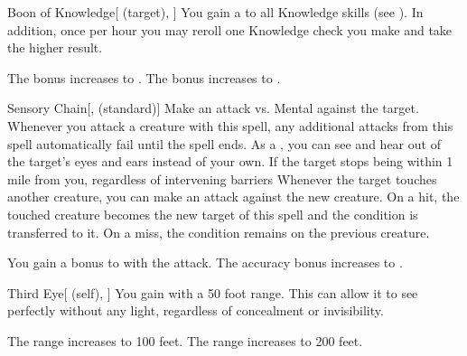 \lowercase{\hypertarget{spell:Boon of Knowledge}{}}\label{spell:Boon of Knowledge}
\begin{attuneability}[Rank 4]{\hypertarget{spell:Boon of Knowledge}{Boon of Knowledge}}[ (target), ]
You gain a   to all Knowledge skills (see ).
In addition, once per hour you may reroll one Knowledge check you make and take the higher result.

\rankline
{} The bonus increases to .
 The bonus increases to .
\end{attuneability}
\vspace{0.25em}



\lowercase{\hypertarget{spell:Sensory Chain}{}}\label{spell:Sensory Chain}
\begin{freeability}[Rank 4]{\hypertarget{spell:Sensory Chain}{Sensory Chain}}[,  (standard)]
Make an attack vs. Mental against the target.
Whenever you attack a creature with this spell, any additional attacks from this spell automatically fail until the spell ends.
\hit As a , you can see and hear out of the target's eyes and ears instead of your own.
If the target stops being within 1 mile from you, regardless of intervening barriers
Whenever the target touches another creature, you can make an attack against the new creature.
On a hit, the touched creature becomes the new target of this spell and the condition is transferred to it.
On a miss, the condition remains on the previous creature.


\rankline
{} You gain a  bonus to  with the attack.
 The accuracy bonus increases to .
\end{freeability}
\vspace{0.25em}



\lowercase{\hypertarget{spell:Third Eye}{}}\label{spell:Third Eye}
\begin{attuneability}[Rank 4]{\hypertarget{spell:Third Eye}{Third Eye}}[ (self), ]
You gain  with a 50 foot range.
This can allow it to see perfectly without any light, regardless of concealment or invisibility.

\rankline
{} The range increases to 100 feet.
 The range increases to 200 feet.
\end{attuneability}
\vspace{0.25em}



